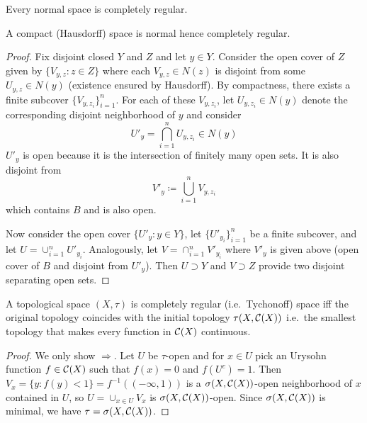 \begin{corollary}
  Every normal space is completely regular.
\end{corollary}

\begin{lemma}
  A compact (Hausdorff) space is normal hence completely regular.
\end{lemma}

\begin{proof}
  Fix disjoint closed $Y$ and $Z$ and let $y \in Y$.
  Consider the open cover of $Z$ given by $\{ V_{y,z} : z \in Z \}$
  where each $V_{y,z} \in N(z)$ is disjoint from some $U_{y,z} \in N(y)$
  (existence ensured by Hausdorff). By compactness,
  there exists a finite subcover $\{V_{y,z_i}\}_{i=1}^n$. For each of these
  $V_{y,z_i}$, let $U_{y, z_i} \in N(y)$ denote the corresponding disjoint
  neighborhood of $y$ and consider
  \[
    U'_y = \bigcap_{i=1}^n U_{y, z_i} \in N(y)
  \]
  $U'_y$ is open because it is the intersection of finitely many open sets.
  It is also disjoint from
  \[
    V'_y \coloneqq \bigcup_{i=1}^n V_{y, z_i}
  \]
  which contains $B$ and is also open.

  Now consider the open cover $\{U'_y : y \in Y\}$,
  let $\{U'_{y_i}\}_{i=1}^n$ be a finite subcover,
  and let $U = \cup_{i=1}^n U'_{y_i}$. Analogously,
  let $V = \cap_{i=1}^n V'_{y_i}$ where $V'_y$ is
  given above (open cover of $B$ and disjoint from $U'_y$).
  Then $U \supset Y$ and $V \supset Z$ provide two disjoint
  separating open sets.
\end{proof}

\begin{lemma}
  \label{lem:completely-regular-equals-initial-topo-cts}
  A topological space $(X, \tau)$ is completely regular (i.e.\ Tychonoff) space
  iff the original topology coincides with the initial topology $\tau(X,
  \mathcal{C}(X))$ i.e.\ the smallest topology that makes every function in $\mathcal{C}(X)$
  continuous.
\end{lemma}

\begin{proof}
  We only show $\Rightarrow$. Let $U$ be $\tau$-open and for $x \in U$
  pick an Urysohn function $f \in \mathcal{C}(X)$ such that $f(x) = 0$
  and $f(U^c) = 1$. Then $V_x = \{y : f(y) < 1\} = f^{-1}((-\infty, 1))$
  is a $\sigma(X, \mathcal{C}(X))$-open neighborhood of $x$ contained
  in $U$, so $U = \cup_{x \in U} V_x$ is $\sigma(X, \mathcal{C}(X))$-open.
  Since $\sigma(X, \mathcal{C}(X))$ is minimal, we have $\tau = \sigma(X, \mathcal{C}(X))$.
\end{proof}

